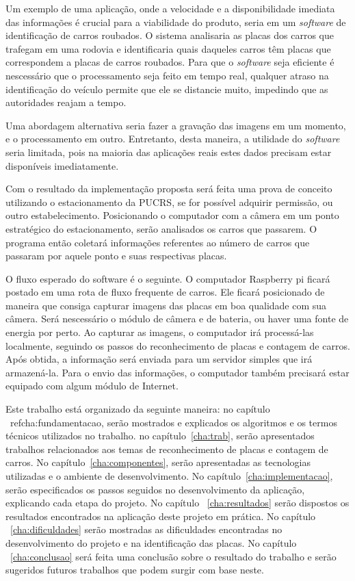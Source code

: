 Um exemplo de uma aplicação, onde a velocidade e a disponibilidade imediata das
informações é crucial para a viabilidade do produto, seria em um \emph{software}
de identificação de carros roubados. O sistema analisaria as placas dos carros
que trafegam em uma rodovia e identificaria quais daqueles carros têm placas que
correspondem a placas de carros roubados. Para que o \emph{software} seja
eficiente é nescessário que o processamento seja feito em tempo real, qualquer
atraso na identificação do veículo permite que ele se distancie muito, impedindo
que as autoridades reajam a tempo.

Uma abordagem alternativa seria fazer a gravação das imagens em um momento, e o
processamento em outro. Entretanto, desta maneira, a utilidade do
\emph{software} seria limitada, pois na maioria das aplicações reais estes dados
precisam estar disponíveis imediatamente.

Com o resultado da implementação proposta será feita uma prova de conceito
utilizando o estacionamento da PUCRS, se for possível adquirir permissão, ou outro estabelecimento.
Posicionando o computador com a câmera em um ponto estratégico do
estacionamento, serão analisados os carros que passarem. O programa então
coletará informações referentes ao número de carros que passaram por aquele ponto
e suas respectivas placas.

O fluxo esperado do software é o seguinte. O computador Raspberry pi ficará
postado em uma rota de fluxo frequente de carros. Ele ficará posicionado de
maneira que consiga capturar imagens das placas em boa qualidade com sua câmera.
Será nescessário o módulo de câmera e de bateria, ou haver uma fonte de energia
por perto. Ao capturar as imagens, o computador irá processá-las localmente,
seguindo os passos do reconhecimento de placas e contagem de carros.  Após
obtida, a informação será enviada para um servidor simples que irá armazená-la.
Para o envio das informações, o computador também precisará estar equipado com
algum módulo de Internet.

Este trabalho está organizado da seguinte maneira: no capítulo ~ref{cha:fundamentacao}, serão mostrados e explicados os algoritmos e os termos técnicos utilizados no trabalho. no capítulo~\ref{cha:trab},
serão apresentados trabalhos relacionados aos temas de reconhecimento de placas
e contagem de carros. No capítulo~\ref{cha:componentes}, serão apresentadas as tecnologias utilizadas e o ambiente de desenvolvimento. No capítulo~\ref{cha:implementacao}, serão especificados os passos seguidos no desenvolvimento da aplicação, explicando cada etapa do projeto. No capítulo ~\ref{cha:resultados} serão dispostos os resultados encontrados na aplicação deste projeto em prática. No capítulo ~\ref{cha:dificuldades} serão mostradas as dificuldades encontradas no desenvolvimento do projeto e na identificação das placas. No capítulo ~\ref{cha:conclusao} será feita uma conclusão sobre o resultado do trabalho e serão sugeridos futuros trabalhos que podem surgir com base neste.
